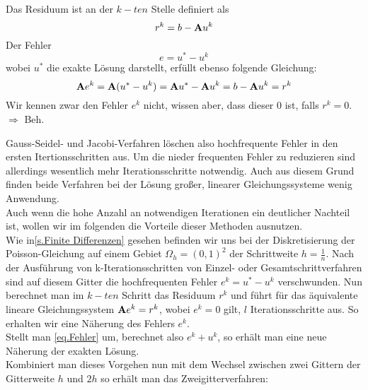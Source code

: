 Das Residuum ist an der $k-ten$ Stelle definiert als 
\begin{equation}
r^{k} = b - {\textbf{A}}u^{k}
\end{equation}
Der Fehler
\begin{equation}
e = u^{*} - u^{k}\label{eq.Fehler}
\end{equation}
wobei $u^{*}$ die exakte Lösung darstellt, erfüllt ebenso folgende Gleichung:
\begin{equation}
{\textbf{A}}e^{k} = {\textbf{A}}(u^{*} - u^{k}) = {\textbf{A}} u^{*} - {\textbf{A}} u^{k} = b - {\textbf{A}} u^{k} = r^{k}
\end{equation}
Wir kennen zwar den Fehler $e^{k}$ nicht, wissen aber, dass dieser $0$ ist, falls $r^{k} = 0$.
$\Longrightarrow$ Beh.

Gauss-Seidel- und Jacobi-Verfahren löschen also hochfrequente Fehler in den ersten Itertionsschritten aus. Um die nieder frequenten Fehler zu reduzieren sind allerdings wesentlich mehr Iterationsschritte notwendig. Auch aus diesem Grund finden beide Verfahren bei der Lösung großer, linearer Gleichungssysteme wenig Anwendung. \\
Auch wenn die hohe Anzahl an notwendigen Iterationen ein deutlicher Nachteil ist, wollen wir im folgenden die Vorteile dieser Methoden ausnutzen. \\%
Wie in\autoref{s.Finite Differenzen} gesehen befinden wir uns bei der Diskretisierung der Poisson-Gleichung auf einem Gebiet $\Omega_{h} = (0,1)^{2}$ der Schrittweite $h = \frac {1} {n}$. Nach der Ausführung von k-Iterationsschritten von Einzel- oder Gesamtschrittverfahren sind auf diesem Gitter die hochfrequenten Fehler $e^{k} = u^{*} - u^{k}$ verschwunden. Nun berechnet man im $k-ten$ Schritt das Residuum $r^{k}$ und führt für das äquivalente lineare Gleichungssystem ${\textbf{A}}e^{k} = r^{k}$, wobei $e^{k} = 0$ gilt, $l$ Iterationsschritte aus. So erhalten wir eine Näherung des Fehlers $e^{k}$. \\
Stellt man \autoref{eq.Fehler} um, berechnet also $e^{k} + u^{k}$, so erhält man eine neue Näherung der exakten Lösung. \\
Kombiniert man dieses Vorgehen nun mit dem Wechsel zwischen zwei Gittern der Gitterweite $h$ und $2h$ so erhält man das Zweigitterverfahren:

